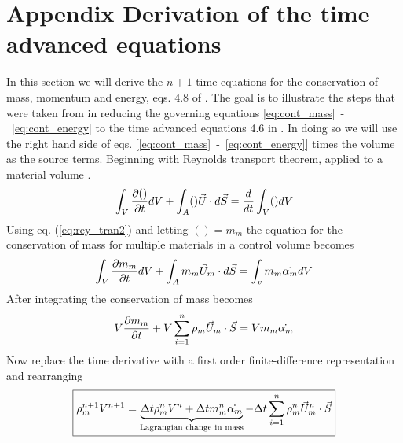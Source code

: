 \documentclass[fleqn]{article}
\begin{document}
{\section{\textsf{Appendix Derivation of the time advanced equations} }
In this section we will derive the $n+1$ time equations for the conservation
of mass, momentum and energy, eqs. 4.8 of .  The goal is
to illustrate the steps that were taken from in reducing the governing
equations \ref{eq:cont_mass}~-~\ref{eq:cont_energy} to the time advanced
equations 4.6 in .  In doing so we will use the right hand
side of eqs. [\ref{eq:cont_mass}~-~\ref{eq:cont_energy}]  times the volume
as the source terms.  Beginning with Reynolds transport theorem, applied to
a material volume .
\begin{equation}
    \label{eq:rey_tran2}
    \int_{V}\pd{()}{t}dV + \int_{A} ()\vec{U} \cdot d\vec{S} = \frac{d}{dt}\int_{V}()dV 
\end{equation}
%
Using eq. (\ref{eq:rey_tran2}) and letting $() = m_m$ the equation for the
conservation of mass for multiple materials in a control volume becomes
%
\begin{equation*}
    \int_{V}\pd{m_m }{t}dV + \int_{A} m_m \um \cdot d\vec{S} 
=   \int_{v} m_m \dot{\alpham}dV 
\end{equation*}
%
After integrating the conservation of mass becomes
% 
\begin{equation*}
    V\pd{m_m}{t}+ V\sumarea \rhom \um \cdot \vec{S} = V m_m \dot{\alpham}
\end{equation*}
%
Now replace the time derivative with a first order finite-difference
representation and rearranging
%
\begin{equation}
    \label{eq:rho}
    \boxed{
    \rhom^{n+1}V^{n+1} = \underbrace{ \delt\rhonm V^{n}  + \delt \massnm \dot{\alpham}}_{        \text{Lagrangian change in mass}  }
-   \delt \sumarea \rhonm  \unm\cdot \vec{S}}
\end{equation}
\\

}
\end{document}
